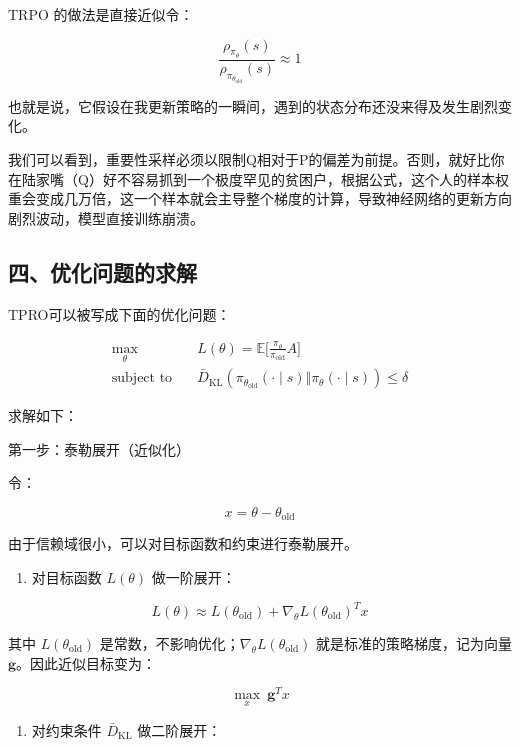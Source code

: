 TRPO 的做法是直接近似令：

\[
\frac{\rho_{\pi_\theta}(s)}{\rho_{\pi_{\theta_{\mathrm{old}}}}(s)}\approx 1
\]

也就是说，它假设在我更新策略的一瞬间，遇到的状态分布还没来得及发生剧烈变化。

我们可以看到，重要性采样必须以限制Q相对于P的偏差为前提。否则，就好比你在陆家嘴（Q）好不容易抓到一个极度罕见的贫困户，根据公式，这个人的样本权重会变成几万倍，这一个样本就会主导整个梯度的计算，导致神经网络的更新方向剧烈波动，模型直接训练崩溃。

\hypertarget{ux56dbux4f18ux5316ux95eeux9898ux7684ux6c42ux89e3}{%
\subsection{四、优化问题的求解}\label{ux56dbux4f18ux5316ux95eeux9898ux7684ux6c42ux89e3}}

TPRO可以被写成下面的优化问题：

\[
\begin{aligned}
\max_\theta\quad
& L(\theta)=\mathbb{E}
\bigl[
\frac{\pi_\theta}{\pi_{\mathrm{old}}}A
\bigr] \\
\text{subject to}\quad
& \bar{D}_{\mathrm{KL}}(
\pi_{\theta_{\mathrm{old}}}(\cdot\mid s)
\Vert
\pi_\theta(\cdot\mid s)
)\le \delta
\end{aligned}
\]

求解如下：

第一步：泰勒展开（近似化）

令：

\[
x=\theta-\theta_{\mathrm{old}}
\]

由于信赖域很小，可以对目标函数和约束进行泰勒展开。

\begin{enumerate}
\def\labelenumi{\arabic{enumi}.}
\tightlist
\item
  对目标函数 \(L(\theta)\) 做一阶展开：
\end{enumerate}

\[
L(\theta)\approx
L(\theta_{\mathrm{old}})
+
\nabla_\theta L(\theta_{\mathrm{old}})^{T}x
\]

其中 \(L(\theta_{\mathrm{old}})\) 是常数，不影响优化；\(\nabla_\theta L(\theta_{\mathrm{old}})\) 就是标准的策略梯度，记为向量 \(\mathbf{g}\)。因此近似目标变为：

\[
\max_x\ \mathbf{g}^{T}x
\]

\begin{enumerate}
\def\labelenumi{\arabic{enumi}.}
\setcounter{enumi}{1}
\tightlist
\item
  对约束条件 \(\bar{D}_{\mathrm{KL}}\) 做二阶展开：
\end{enumerate}

